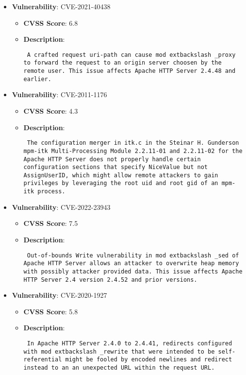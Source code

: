 \documentclass{article}
\begin{document}
\begin{itemize}
        \item \textbf{Vulnerability}: CVE-2021-40438
        \begin{itemize}
            \item \textbf{CVSS Score}:  6.8 
            \item \textbf{Description}: \parbox{\linewidth}{\texttt{ A crafted request uri-path can cause mod	extbackslash _proxy to forward the request to an origin server choosen by the remote user. This issue affects Apache HTTP Server 2.4.48 and earlier. }}
        \end{itemize}
    
        \item \textbf{Vulnerability}: CVE-2011-1176
        \begin{itemize}
            \item \textbf{CVSS Score}:  4.3 
            \item \textbf{Description}: \parbox{\linewidth}{\texttt{ The configuration merger in itk.c in the Steinar H. Gunderson mpm-itk Multi-Processing Module 2.2.11-01 and 2.2.11-02 for the Apache HTTP Server does not properly handle certain configuration sections that specify NiceValue but not AssignUserID, which might allow remote attackers to gain privileges by leveraging the root uid and root gid of an mpm-itk process. }}
        \end{itemize}
    
        \item \textbf{Vulnerability}: CVE-2022-23943
        \begin{itemize}
            \item \textbf{CVSS Score}:  7.5 
            \item \textbf{Description}: \parbox{\linewidth}{\texttt{ Out-of-bounds Write vulnerability in mod	extbackslash _sed of Apache HTTP Server allows an attacker to overwrite heap memory with possibly attacker provided data. This issue affects Apache HTTP Server 2.4 version 2.4.52 and prior versions. }}
        \end{itemize}
    
        \item \textbf{Vulnerability}: CVE-2020-1927
        \begin{itemize}
            \item \textbf{CVSS Score}:  5.8 
            \item \textbf{Description}: \parbox{\linewidth}{\texttt{ In Apache HTTP Server 2.4.0 to 2.4.41, redirects configured with mod	extbackslash _rewrite that were intended to be self-referential might be fooled by encoded newlines and redirect instead to an an unexpected URL within the request URL. }}
        \end{itemize}
    

\end{itemize}
\end{document}
